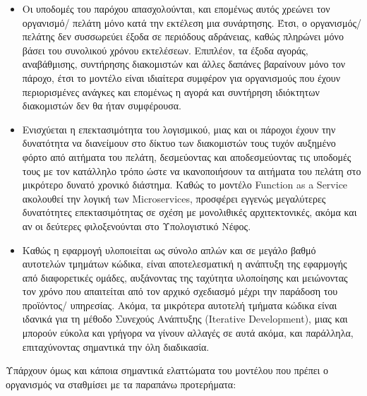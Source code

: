 \documentclass{article}
\begin{document}
\begin{itemize}
\item Οι υποδομές του παρόχου απασχολούνται, και επομένως αυτός χρεώνει τον οργανισμό/ πελάτη μόνο κατά την εκτέλεση μια συνάρτησης. Έτσι, ο οργανισμός/ πελάτης δεν συσσωρεύει έξοδα σε περιόδους αδράνειας, καθώς πληρώνει μόνο βάσει του συνολικού χρόνου εκτελέσεων. Επιπλέον, τα έξοδα αγοράς, αναβάθμισης, συντήρησης διακομιστών και άλλες δαπάνες βαραίνουν μόνο τον πάροχο, έτσι το μοντέλο είναι ιδιαίτερα συμφέρον για οργανισμούς που έχουν περιορισμένες ανάγκες και επομένως η αγορά και συντήρηση ιδιόκτητων διακομιστών δεν θα ήταν συμφέρουσα.
\item Ενισχύεται η επεκτασιμότητα του λογισμικού, μιας και οι πάροχοι έχουν την δυνατότητα να διανείμουν στο δίκτυο των διακομιστών τους τυχόν αυξημένο φόρτο από αιτήματα του πελάτη, δεσμεύοντας και αποδεσμεύοντας τις υποδομές τους με τον κατάλληλο τρόπο ώστε να ικανοποιήσουν τα αιτήματα του πελάτη στο μικρότερο δυνατό χρονικό διάστημα. Καθώς το μοντέλο Function as a Service ακολουθεί την λογική των  Microservices, προσφέρει εγγενώς μεγαλύτερες δυνατότητες επεκτασιμότητας σε σχέση με μονολιθικές αρχιτεκτονικές, ακόμα και αν οι δεύτερες φιλοξενούνται στο Υπολογιστικό Νέφος.
\item Καθώς η εφαρμογή υλοποιείται ως σύνολο απλών και σε μεγάλο βαθμό αυτοτελών τμημάτων κώδικα, είναι αποτελεσματική η ανάπτυξη της εφαρμογής από διαφορετικές ομάδες, αυξάνοντας της ταχύτητα υλοποίησης και μειώνοντας τον χρόνο που απαιτείται από τον αρχικό σχεδιασμό μέχρι την παράδοση του προϊόντος/ υπηρεσίας. Ακόμα, τα μικρότερα αυτοτελή τμήματα κώδικα είναι ιδανικά για τη μέθοδο Συνεχούς Ανάπτυξης (Iterative Development), μιας και μπορούν εύκολα και γρήγορα να γίνουν αλλαγές σε αυτά ακόμα, και παράλληλα, επιταχύνοντας σημαντικά την όλη διαδικασία.
\end{itemize}

Υπάρχουν όμως και κάποια σημαντικά ελαττώματα του μοντέλου που πρέπει ο οργανισμός να σταθμίσει με τα παραπάνω προτερήματα:
\end{document}
